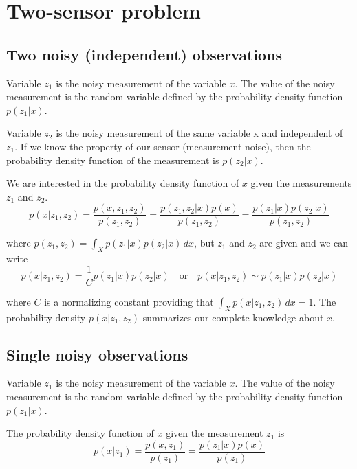 \section{Two-sensor problem}

\subsection{Two noisy (independent) observations}

Variable $z_1$ is the noisy measurement of the variable $x$. The value of the
noisy measurement is the random variable defined by the probability density
function $p(z_1|x)$.

Variable $z_2$ is the noisy measurement of the same variable x and independent
of $z_1$. If we know the property of our sensor (measurement noise), then the
probability density function of the measurement is $p(z_2|x)$.

We are interested in the probability density function of $x$ given the
measurements $z_1$ and $z_2$.
\begin{equation*}
  p(x|z_1, z_2) = \frac{p(x, z_1, z_2)}{p(z_1, z_2)}
                = \frac{p(z_1, z_2|x)p(x)}{p(z_1, z_2)}
                = \frac{p(z_1|x) p(z_2|x)}{p(z_1, z_2)}
\end{equation*}

where $p(z_1, z_2) = \int_X p(z_1|x) p(z_2|x) \,dx$, but $z_1$ and $z_2$ are
given and we can write
\begin{equation*}
  p(x|z_1, z_2) = \frac{1}{C} p(z_1|x) p(z_2|x) \quad \text{or} \quad
    p(x|z_1, z_2) \sim p(z_1|x) p(z_2|x)
\end{equation*}

where $C$ is a normalizing constant providing that
$\int_X p(x|z_1, z_2) \,dx = 1$. The probability density $p(x|z_1, z_2)$
summarizes our complete knowledge about $x$.

\subsection{Single noisy observations}

Variable $z_1$ is the noisy measurement of the variable $x$. The value of the
noisy measurement is the random variable defined by the probability density
function $p(z_1|x)$.

The probability density function of $x$ given the measurement $z_1$ is
\begin{equation*}
  p(x|z_1) = \frac{p(x, z_1)}{p(z_1)} = \frac{p(z_1|x) p(x)}{p(z_1)}
\end{equation*}

